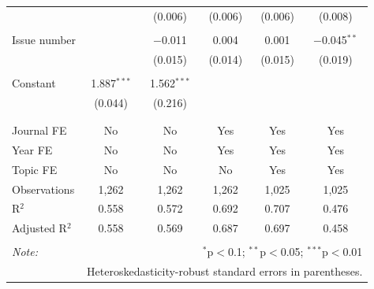 \begin{table}[!htbp]
\begin{tabular}{@{\extracolsep{5pt}}lccccc}
  &  & (0.006) & (0.006) & (0.006) & (0.008) \\ 
  & & & & & \\ 
 Issue number &  & $-$0.011 & 0.004 & 0.001 & $-$0.045$^{**}$ \\ 
  &  & (0.015) & (0.014) & (0.015) & (0.019) \\ 
  & & & & & \\ 
 Constant & 1.887$^{***}$ & 1.562$^{***}$ &  &  &  \\ 
  & (0.044) & (0.216) &  &  &  \\ 
  & & & & & \\ 
\hline \\[-1.8ex] 
Journal FE & No & No & Yes & Yes & Yes \\ 
Year FE & No & No & Yes & Yes & Yes \\ 
Topic FE & No & No & No & Yes & Yes \\ 
Observations & 1,262 & 1,262 & 1,262 & 1,025 & 1,025 \\ 
R$^{2}$ & 0.558 & 0.572 & 0.692 & 0.707 & 0.476 \\ 
Adjusted R$^{2}$ & 0.558 & 0.569 & 0.687 & 0.697 & 0.458 \\ 
\hline 
\hline \\[-1.8ex] 
\textit{Note:}  & \multicolumn{5}{r}{$^{*}$p$<$0.1; $^{**}$p$<$0.05; $^{***}$p$<$0.01} \\ 
 & \multicolumn{5}{r}{Heteroskedasticity-robust standard errors in parentheses.} \\ 
\end{tabular} 
\end{table} 
